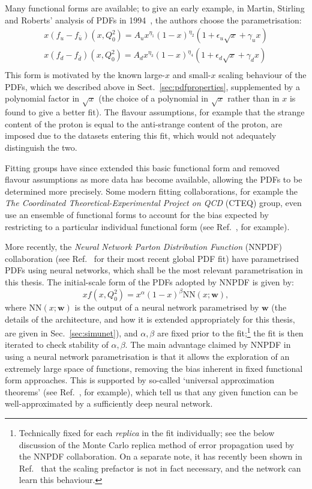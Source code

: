 \documentclass[withindex,glossary]{cam-thesis}
\renewcommand{\vec}[1]{\textbf{#1}} %
\begin{document}
Many functional forms are available; to give an early example, in Martin, Stirling and Roberts' analysis of PDFs in 1994~\cite{Martin:1994kn}, the authors choose the parametrisation:
\begin{align}
x(f_u - f_{\bar{u}})(x,Q_0^2) = A_u x^{\eta_1} (1-x)^{\eta_2} (1 + \epsilon_u \sqrt{x} + \gamma_u x)\\
x(f_d - f_{\bar{d}})(x,Q_0^2) = A_d x^{\eta_3} (1-x)^{\eta_4} (1 + \epsilon_d \sqrt{x} + \gamma_d x)\\
\end{align}
This form is motivated by the known large-$x$ and small-$x$ scaling behaviour of the PDFs, which we described above in Sect.~\ref{sec:pdfproperties}, supplemented by a polynomial factor in $\sqrt{x}$ (the choice of a polynomial in $\sqrt{x}$ rather than in $x$ is found to give a better fit). The flavour assumptions, for example that the strange content of the proton is equal to the anti-strange content of the proton, are imposed due to the datasets entering this fit, which would not adequately distinguish the two.

Fitting groups have since extended this basic functional form and removed flavour assumptions as more data has become available, allowing the PDFs to be determined more precisely. Some modern fitting collaborations, for example the \textit{The Coordinated Theoretical-Experimental Project on QCD} (CTEQ) group, even use an ensemble of functional forms to account for the bias expected by restricting to a particular individual functional form (see Ref.~\cite{Hou:2019efy}, for example).

More recently, the \textit{Neural Network Parton Distribution Function} (NNPDF) collaboration (see Ref.~\cite{NNPDF:2021njg} for their most recent global PDF fit) have parametrised PDFs using neural networks, which shall be the most relevant parametrisation in this thesis. The initial-scale form of the PDFs adopted by NNPDF is given by:
\begin{equation}
xf(x,Q_0^2) = x^{\alpha}(1-x)^{\beta} \text{NN}(x; \vec{w}),
\end{equation}
where $\text{NN}(x; \vec{w})$ is the output of a neural network parametrised by $\vec{w}$ (the details of the architecture, and how it is extended appropriately for this thesis, are given in Sec.~\ref{sec:simunet}), and $\alpha, \beta$ are fixed prior to the fit;\footnote{Technically fixed for each \textit{replica} in the fit individually; see the below discussion of the Monte Carlo replica method of error propagation used by the NNPDF collaboration. On a separate note, it has recently been shown in Ref.~\cite{Carrazza:2021yrg} that the scaling prefactor is not in fact necessary, and the network can learn this behaviour.} the fit is then iterated to check stability of $\alpha, \beta$. The main advantage claimed by NNPDF in using a neural network parametrisation is that it allows the exploration of an extremely large space of functions, removing the bias inherent in fixed functional form approaches. This is supported by so-called `universal approximation theorems' (see Ref.~\cite{HORNIK1989359}, for example), which tell us that any given function can be well-approximated by a sufficiently deep neural network.
\end{document}
